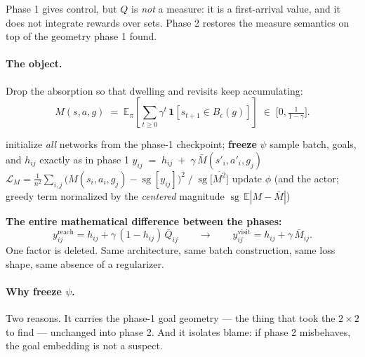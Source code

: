 \documentclass[11pt]{article}
\newcommand{\E}{\mathbb{E}}
\newcommand{\ind}[1]{\mathbf{1}\!\left[#1\right]}
\newcommand{\sg}{\operatorname{sg}}
\newcommand{\ball}[1]{B_\epsilon(#1)}
\begin{document}
Phase 1 gives control, but $Q$ is \emph{not} a measure: it is a first-arrival
value, and it does not integrate rewards over sets. Phase 2 restores the measure
semantics on top of the geometry phase 1 found.

\paragraph{The object.} Drop the absorption so that dwelling and revisits keep
accumulating:
\begin{equation}
\label{eq:Mobj}
M(s,a,g) \;=\; \E_\pi\!\left[\sum_{t\ge0}\gamma^{t}\,\ind{s_{t+1}\in \ball{g}}\right]\;\in\;\Big[0,\tfrac{1}{1-\gamma}\Big].
\end{equation}

\begin{algorithm}[h]
\caption{Phase 2 --- visitation measure on the frozen goal embedding}
\begin{algorithmic}[1]
\State initialize \emph{all} networks from the phase-1 checkpoint; \textbf{freeze} $\psi$
  \State sample batch, goals, and $h_{ij}$ exactly as in phase 1
  \State $y_{ij} \;=\; h_{ij} \;+\; \gamma\,\bar M(s'_i,a'_i,g_j)$ 
  \State $\displaystyle \mathcal{L}_M=\frac{1}{n^2}\sum_{i,j}\big(M(s_i,a_i,g_j)-\sg[y_{ij}]\big)^{2}\;\big/\;\sg\big[\overline{M^{2}}\big]$
  \State update $\phi$ (and the actor; greedy term normalized by the \emph{centered} magnitude $\sg\,\E|M-\bar M|$)
\EndFor
\end{algorithmic}
\end{algorithm}

\begin{keybox}
\textbf{The entire mathematical difference between the phases:}
\[
y^{\mathrm{reach}}_{ij}=h_{ij}+\gamma\,(1-h_{ij})\,\bar Q_{ij}
\qquad\longrightarrow\qquad
y^{\mathrm{visit}}_{ij}=h_{ij}+\gamma\,\bar M_{ij}.
\]
One factor is deleted. Same architecture, same batch construction, same loss
shape, same absence of a regularizer.
\end{keybox}

\paragraph{Why freeze $\psi$.} Two reasons. It carries the phase-1 goal geometry
--- the thing that took the $2\times2$ to find --- unchanged into phase 2. And it
isolates blame: if phase 2 misbehaves, the goal embedding is not a suspect.
\end{document}
